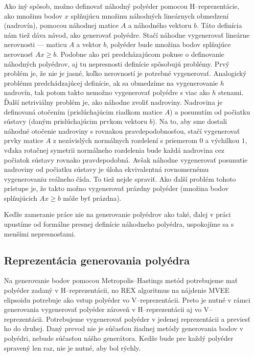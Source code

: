 Ako iný spôsob, možno definovať náhodný polyéder pomocou H--reprezentácie, ako množinu bodov $x$ splňujúcu množinu náhodných lineárnych obmedzení (nadrovín), pomocou náhodnej matice $A$ a náhodného vektoru $b$. Táto definícia nám tiež dáva návod, ako generovať polyédre. Stačí náhodne vygenerovať lineárne nerovnosti --- maticu $A$ a vektor $b$, polyéder bude množina bodov splňujúce nerovnosť $Ax\geq b$. Podobne ako pri predcházajúcom pokuse o definovanie náhodných polyédrov, aj tu nepresnosti definície spôsobujú problémy. Prvý problém je, že nie je jasné, koľko nerovností je potrebné vygenerovať. Analogický problému predchádzajúcej definície, ak sa obmedzíme na vygenerovanie $h$ nadrovín, tak potom takto nemožno vygenerovať polyédre s viac ako $h$ stenami.
Ďalší netriviálny problém je, ako náhodne zvoliť nadroviny. Nadrovina je definovaná otočením (prislúchajúcim riadkom matice $A$) a posunutím od počiatku sústavy (daným prislúchajúcim prvkom vektoru $b$). Na to, aby sme dostali náhodné otočenie nadroviny s rovnakou pravdepodobnosťou, stačí vygenerovať prvky matice $A$ z nezávislých normálnych rozdelení s priemerom $0$ a výchilkou $1$, vďaka rotačnej symetrii normálneho rozdelenia bude každá nadrovina cez počiatok sústavy rovnako pravdepodobná. Avšak náhodne vygenerovať posunutie nadroviny od počiatku sústavy je úloha ekvivalentná rovnomernému vygenerovaniu reálneho čísla. To tiež nejde spraviť. Ako ďalší problém tohoto prístupe je, že takto možno vygenerovať prázdny polyéder (množina bodov splňujúcich $Ax \geq b$ môže byť prázdna).

Keďže zameranie práce nie na generovanie polyédrov ako také, ďalej v práci upustíme od formálne presnej definície náhodneho polyédra, uspokojíme sa s menšími nepresnosťami.\\

\subsection{Reprezentácia generovania polyédra}
Na generovanie bodov pomocou Metropolis--Hastings metód potrebujeme mať polyéder zadaný v H--reprezentácii, no REX algoritmus na nájdenie MVEE elipsoidu potrebuje ako vstup polyéder vo V--reprezentácii. Preto je nutné v rámci generovania vygenerovať polyéder zároveň v H--reprezentácii aj vo V--reprezentácii. Potrebujeme vygenerovať polyéder v jedenej reprezentácii a previesť ho do druhej. Daný prevod nie je súčasťou žiadnej metódy generovania bodov v polyédri, nebude súčasťou nášho generátora. Kedže bude pre každý polyéder spravený len raz, nie je nutné, aby bol rýchly.\\

